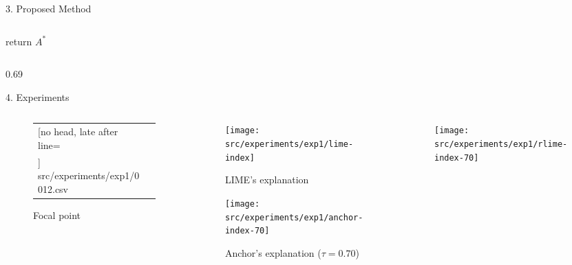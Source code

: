 \documentclass[unicode]{beamer}
\begin{document}
\begin{frame}
\begin{columns}[t]
\begin{column}{\rcol\textwidth}
\begin{block}{3. Proposed Method}
\begin{columns}[t]
\begin{column}{\rcol\textwidth}
						\vspace{-0.8em}
						return $A^*$
					\end{column}
				\end{columns}
			\end{block}
		\end{column}
	\end{columns}
	\begin{columns}[t]
		\def\lcol{0.69}
		\def\rcol{0.30}
		\hspace{-1.0em}
		\begin{column}{\lcol\textwidth}
			\begin{block}{4. Experiments}
				\def\index{0012}
				\vspace{-0.4em}
				\begin{columns}[t]
					\begin{column}{.31\textwidth}
						\vspace{1.0em}
						\begin{figure}[tbp]
							\centering
							{
								\tiny
								\selectfont
								\begin{tabular}{p{10em}m{14em}}
									\toprule
									\csvreader[no head, late after line= \\]{%
										src/experiments/exp1/\index.csv
									}{}{%
									\ifnum\thecsvrow=16 \midrule\fi\csvcoli & \csvcolii %
									}
									\bottomrule
								\end{tabular}
							}
							\vspace{1.0em}
							\caption{Focal point}
						\end{figure}
					\end{column}
					\begin{column}{.290\textwidth}
						\vspace{0.5em}
						\begin{figure}
							\texttt{[image: src/experiments/exp1/lime-\\index]}
							\caption{LIME's explanation}
						\end{figure}
						\vspace{0.2em}
						\begin{figure}
							\texttt{[image: src/experiments/exp1/anchor-\\index-70]}
							\vspace{-1.8em}
							\caption{Anchor's explanation ($\tau=0.70$)}
						\end{figure}
					\end{column}
					\begin{column}{.295\textwidth}
						\vspace{-0.4em}
						\begin{figure}
							\texttt{[image: src/experiments/exp1/rlime-\\index-70]}


\end{figure}
\end{column}
\end{columns}
\end{block}
\end{column}
\end{columns}
\end{frame}
\end{document}
